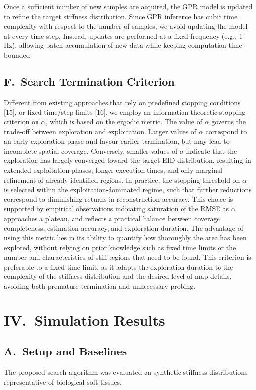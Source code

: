\documentclass[11pt]{article}
\begin{document}
Once a sufficient number of new samples are acquired, the GPR model
is updated to refine the target stiffness distribution. Since GPR
inference has cubic time complexity with respect to the number of
samples, we avoid updating the model at every time step. Instead,
updates are performed at a fixed frequency (e.g., 1 Hz), allowing
batch accumulation of new data while keeping computation time
bounded.

\subsection*{F.\ Search Termination Criterion}

Different from existing approaches that rely on predefined stopping
conditions [15], or fixed time/step limits [16], we employ an
information-theoretic stopping criterion on $\alpha$, which is based
on the ergodic metric. The value of $\alpha$ governs the trade-off
between exploration and exploitation. Larger values of $\alpha$
correspond to an early exploration phase and favour earlier
termination, but may lead to incomplete spatial coverage. Conversely,
smaller values of $\alpha$ indicate that the exploration has largely
converged toward the target EID distribution, resulting in extended
exploitation phases, longer execution times, and only marginal
refinement of already identified regions. In practice, the stopping
threshold on $\alpha$ is selected within the exploitation-dominated
regime, such that further reductions correspond to diminishing
returns in reconstruction accuracy. This choice is supported by
empirical observations indicating saturation of the RMSE as $\alpha$
approaches a plateau, and reflects a practical balance between
coverage completeness, estimation accuracy, and exploration duration.
The advantage of using this metric lies in its ability to quantify
how thoroughly the area has been explored, without relying on prior
knowledge such as fixed time limits or the number and characteristics
of stiff regions that need to be found. This criterion is preferable
to a fixed-time limit, as it adapts the exploration duration to the
complexity of the stiffness distribution and the desired level of map
details, avoiding both premature termination and unnecessary probing.

\section*{IV.\ Simulation Results}

\subsection*{A.\ Setup and Baselines}

The proposed search algorithm was evaluated on synthetic stiffness
distributions representative of biological soft tissues.
\end{document}
